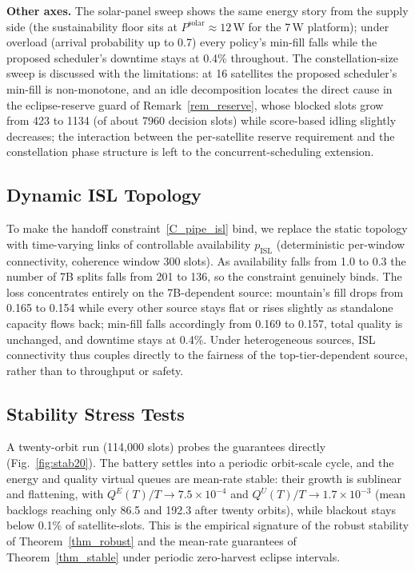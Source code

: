 \textbf{Other axes.} The solar-panel sweep shows the same energy story from the
supply side (the sustainability floor sits at $P^{\text{solar}}\!\approx\!12$\,W
for the 7\,W platform); under overload (arrival probability up to 0.7) every
policy's min-fill falls while the proposed scheduler's downtime stays at 0.4\%
throughout. The constellation-size sweep is discussed with the limitations: at
16 satellites the proposed scheduler's min-fill is non-monotone, and an idle
decomposition locates the direct cause in the eclipse-reserve guard of
Remark~\ref{rem_reserve}, whose blocked slots grow from 423 to 1134 (of about
7960 decision slots) while score-based idling slightly decreases; the
interaction between the per-satellite reserve requirement and the constellation
phase structure is left to the concurrent-scheduling extension.

\subsection{Dynamic ISL Topology}\label{EV_ISL}
To make the handoff constraint~\eqref{C_pipe_isl} bind, we replace the static
topology with time-varying links of controllable availability
$p_{\text{ISL}}$ (deterministic per-window connectivity, coherence window 300
slots). As availability falls from 1.0 to 0.3 the number of 7B splits falls
from 201 to 136, so the constraint genuinely binds. The loss concentrates
entirely on the 7B-dependent source: mountain's fill drops from 0.165 to 0.154
while every other source stays flat or rises slightly as standalone capacity
flows back; min-fill falls accordingly from 0.169 to 0.157, total quality is
unchanged, and downtime stays at 0.4\%. Under heterogeneous sources, ISL
connectivity thus couples directly to the fairness of the top-tier-dependent
source, rather than to throughput or safety.

\subsection{Stability Stress Tests}\label{EV_STAB}
A twenty-orbit run (114{,}000 slots) probes the guarantees directly
(Fig.~\ref{fig:stab20}). The battery settles into a periodic orbit-scale cycle,
and the energy and quality virtual queues are mean-rate stable: their growth is
sublinear and flattening, with $Q^E(T)/T \to 7.5\times10^{-4}$ and
$Q^U(T)/T \to 1.7\times10^{-3}$ (mean backlogs reaching only 86.5 and 192.3
after twenty orbits), while blackout stays below 0.1\% of satellite-slots. This
is the empirical signature of the robust stability of Theorem~\ref{thm_robust}
and the mean-rate guarantees of Theorem~\ref{thm_stable} under periodic
zero-harvest eclipse intervals.

